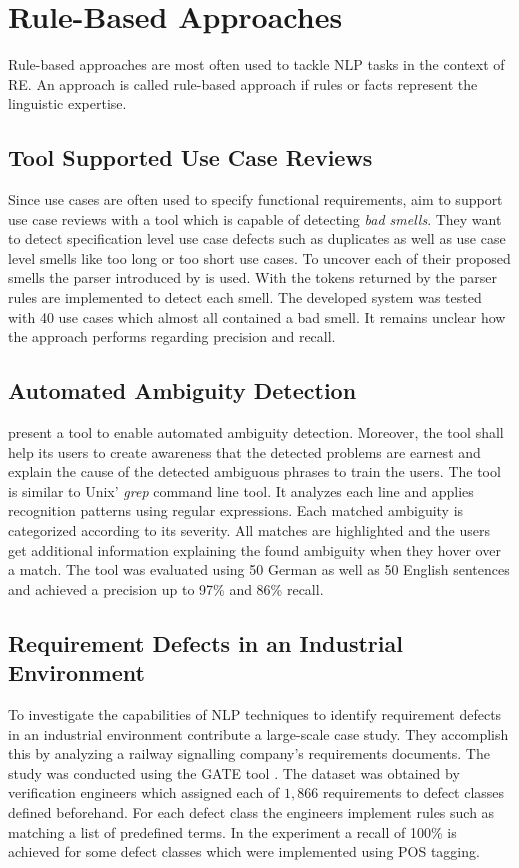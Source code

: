 \section{Rule-Based Approaches}
\label{chp:related_research:sec:rule_based approaches}
Rule-based approaches are most often used to tackle \ac{NLP} tasks in the context of \ac{RE}.
An approach is called rule-based approach if rules or facts represent the linguistic expertise. \parencite{Zhao:2020}

\subsection{Tool Supported Use Case Reviews}
Since use cases are often used to specify functional requirements, \textcite{Ciemniewska:2007} aim to support use case reviews with a tool which is capable of detecting \textit{bad smells}.
They want to detect specification level use case defects such as duplicates as well as use case level smells like too long or too short use cases.
To uncover each of their proposed smells the parser introduced by \textcite{Klein:2002} is used.
With the tokens returned by the parser rules are implemented to detect each smell.
The developed system was tested with 40 use cases which almost all contained a bad smell.
It remains unclear how the approach performs regarding precision and recall.

\subsection{Automated Ambiguity Detection}
\textcite{Gleich:2010} present a tool to enable automated ambiguity detection.
Moreover, the tool shall help its users to create awareness that the detected problems are earnest and explain the cause of the detected ambiguous phrases to train the users.
The tool is similar to Unix' \textit{grep} command line tool.
It analyzes each line and applies recognition patterns using regular expressions.
Each matched ambiguity is categorized according to its severity.
All matches are highlighted and the users get additional information explaining the found ambiguity when they hover over a match.
The tool was evaluated using 50 German as well as 50 English sentences and achieved a precision up to 97\% and 86\% recall.

\subsection{Requirement Defects in an Industrial Environment}
To investigate the capabilities of \ac{NLP} techniques to identify requirement defects in an industrial environment \textcite{Rosadini:2017} contribute a large-scale case study.
They accomplish this by analyzing a railway signalling company's requirements documents.
The study was conducted using the \ac{GATE} tool \parencite{Cunningham:2002}.
The dataset was obtained by verification engineers which assigned each of $1,866$ requirements to defect classes defined beforehand.
For each defect class the engineers implement rules such as matching a list of predefined terms.
In the experiment a recall of 100\% is achieved for some defect classes which were implemented using \ac{POS} tagging.

